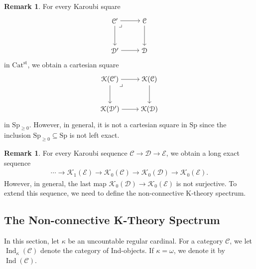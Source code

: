 \documentclass[a4paper,dvipdfmx,11pt,reqno]{amsart}
\newcommand{\C}{\mathcal{C}}
\newcommand{\D}{\mathcal{D}}
\newcommand{\E}{\mathcal{E}}
\newcommand{\K}{\mathcal{K}}
\DeclareMathOperator{\Ind}{Ind}
\newcommand{\Catst}{\mathrm{Cat^{st}}}
\newcommand{\Sp}{\mathrm{Sp}}
\theoremstyle{definition}
\newtheorem{remark}[theorem]{Remark}
\begin{document}
\begin{remark}
  For every Karoubi square 
  \[\begin{tikzpicture}[auto,->] 
    \node (tl) at (0,1.5) {$\C'$}; 
    \node (tr) at (1.5,1.5) {$\C$};
    \node (bl) at (0,0) {$\D'$}; 
    \node (br) at (1.5,0) {$\D$}; 
    \draw (tl) -- node {} (tr); 
    \draw (bl) -- node[swap] {} (br); 
    \draw (tl) -- node[swap] {} (bl);
    \draw (tr) -- node {} (br);
    \node at (tl.south east) {$\lrcorner$}; 
  \end{tikzpicture}\]
  in $\Catst$, we obtain a cartesian square
  \[\begin{tikzpicture}[auto,->] 
    \node (tl) at (0,1.5) {$\K(\C')$}; 
    \node (tr) at (2,1.5) {$\K(\C)$};
    \node (bl) at (0,0) {$\K(\D')$}; 
    \node (br) at (2,0) {$\K(\D)$}; 
    \draw (tl) -- node {} (tr); 
    \draw (bl) -- node[swap] {} (br); 
    \draw (tl) -- node[swap] {} (bl);
    \draw (tr) -- node {} (br); 
    \node at (tl.south east) {$\lrcorner$};
  \end{tikzpicture}\]
  in $\Sp_{\geq 0}$.
  However, in general, it is not a cartesian square in $\Sp$ since the inclusion $\Sp_{\geq 0} \subseteq \Sp$ is not left exact.
\end{remark}

\begin{remark}
  For every Karoubi sequence $\C \to \D \to \E$, we obtain a long exact sequence
  \begin{align*}
    \cdots \to \K_1(\E) \to \K_0(\C) \to \K_0(\D) \to \K_0(\E).
  \end{align*}
  However, in general, the last map $\K_0(\D) \to \K_0(\E)$ is not surjective.
  To extend this sequence, we need to define the non-connective K-theory spectrum.
\end{remark}

\subsection{The Non-connective K-Theory Spectrum}

In this section, let $\kappa$ be an uncountable regular cardinal.
For a category $\C$, we let $\Ind_{\kappa}(\C)$ denote the category of Ind-objects.
If $\kappa=\omega$, we denote it by $\Ind(\C)$.
\end{document}
